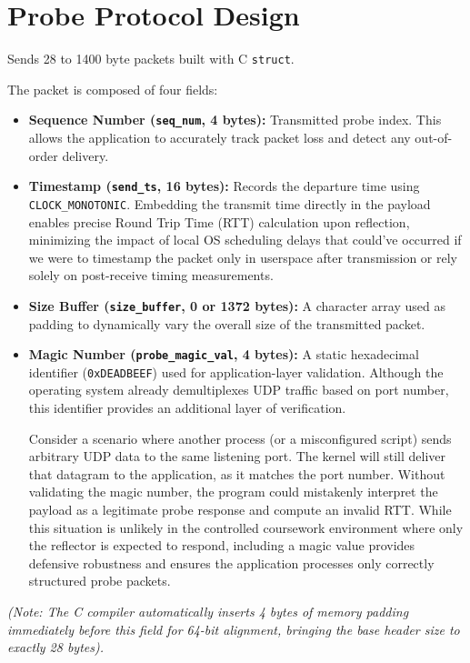 \section{Probe Protocol Design}

Sends 28 to 1400 byte packets built with C \texttt{struct}.

The packet is composed of four fields:
\begin{itemize}
    \item \textbf{Sequence Number (\texttt{seq\_num}, 4 bytes):} Transmitted probe index. This allows the application to accurately track packet loss and detect any out-of-order delivery.
    
    \item \textbf{Timestamp (\texttt{send\_ts}, 16 bytes):} Records the departure time using \texttt{CLOCK\_MONOTONIC}. Embedding the transmit time directly in the payload enables precise Round Trip Time (RTT) calculation upon reflection, minimizing the impact of local OS scheduling delays that could've occurred if we were to timestamp the packet only in userspace after transmission or rely solely on post-receive timing measurements. 

    \item \textbf{Size Buffer (\texttt{size\_buffer}, 0 or 1372 bytes):} A character array used as padding to dynamically vary the overall size of the transmitted packet.

    \item \textbf{Magic Number (\texttt{probe\_magic\_val}, 4 bytes):} A static hexadecimal identifier (\texttt{0xDEADBEEF}) used for application-layer validation. Although the operating system already demultiplexes UDP traffic based on port number, this identifier provides an additional layer of verification. 

    Consider a scenario where another process (or a misconfigured script) sends arbitrary UDP data to the same listening port. The kernel will still deliver that datagram to the application, as it matches the port number. Without validating the magic number, the program could mistakenly interpret the payload as a legitimate probe response and compute an invalid RTT. While this situation is unlikely in the controlled coursework environment where only the reflector is expected to respond, including a magic value provides defensive robustness and ensures the application processes only correctly structured probe packets.
\end{itemize}

\textit{(Note: The C compiler automatically inserts 4 bytes of memory padding immediately before this field for 64-bit alignment, bringing the base header size to exactly 28 bytes).}